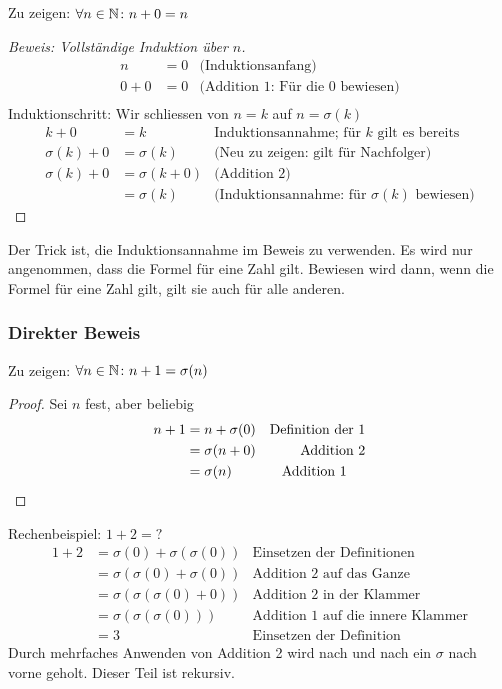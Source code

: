 Zu zeigen: $\forall n \in \mathbb{N} \colon n + 0 = n$
\begin{proof}[Beweis: Vollständige Induktion über $n$]
	\begin{align*}
		n	& = 0	& \mbox{(Induktionsanfang)}\\
		0 + 0& = 0	& \mbox{(Addition 1: Für die 0 bewiesen)}\\
	\end{align*}
	Induktionschritt: Wir schliessen von $n = k$ auf $n = \sigma(k)$
	\begin{align*}
		k + 0 	& = k	& \mbox{Induktionsannahme; für $k$ gilt es bereits}\\
		\sigma(k) + 0	& = \sigma(k)		& \mbox{(Neu zu zeigen: gilt für Nachfolger)}\\
		\sigma(k) + 0	& = \sigma(k + 0)	& \mbox{(Addition 2)}\\
						& = \sigma(k)		& \mbox{(Induktionsannahme: für $\sigma(k)$ bewiesen)}
	\end{align*}
\end{proof}
Der Trick ist, die Induktionsannahme im Beweis zu verwenden. Es wird nur angenommen, dass die Formel für eine Zahl gilt.
Bewiesen wird dann, wenn die Formel für eine Zahl gilt, gilt sie auch für alle anderen.

\subsubsection{Direkter Beweis}
Zu zeigen: $\forall n \in \mathbb{N} \colon n + 1 = \sigma(n)$
\begin{proof}
	Sei $n$ fest, aber beliebig
	\begin{align*}
	n + 1	& = n + \sigma(0) 	& \mbox{Definition der 1}\\
			& = \sigma(n + 0)	& \mbox{Addition 2}\\
			& = \sigma(n)		& \mbox{Addition 1~~~~}\qedhere
	\end{align*}
\end{proof}

Rechenbeispiel: $1 + 2 = ?$
\begin{align*}
	1 + 2	& = \sigma(0) + \sigma(\sigma(0))			& \mbox{Einsetzen der Definitionen}\\
			& = \sigma(\sigma(0) + \sigma(0))			& \mbox{Addition 2 auf das Ganze}\\
			& = \sigma(\sigma(\sigma(0) + 0))			& \mbox{Addition 2 in der Klammer}\\
			& = \sigma(\sigma(\sigma(0)))				& \mbox{Addition 1 auf die innere Klammer}\\
			& = 3										& \mbox{Einsetzen der Definition}
\end{align*}
Durch mehrfaches Anwenden von Addition 2 wird nach und nach ein $\sigma$ nach vorne geholt. Dieser Teil ist rekursiv.



